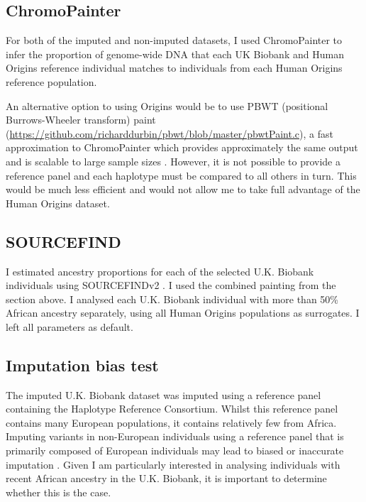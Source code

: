 \subsection{ChromoPainter}

For both of the imputed and non-imputed datasets, I used ChromoPainter to infer the proportion of genome-wide DNA that each UK Biobank and Human Origins reference individual matches to individuals from each Human Origins reference population. 

An alternative option to using Origins would be to use PBWT (positional Burrows-Wheeler transform) paint (\url{https://github.com/richarddurbin/pbwt/blob/master/pbwtPaint.c}), a fast approximation to ChromoPainter which provides approximately the same output and is scalable to large sample sizes \cite{byrne2020dutch}. However, it is not possible to provide a reference panel and each haplotype must be compared to all others in turn. This would be much less efficient and would not allow me to take full advantage of the Human Origins dataset. 

\subsection{SOURCEFIND}

I estimated ancestry proportions for each of the selected U.K. Biobank individuals using SOURCEFINDv2 \cite{Chacon-Duque2018}. I used the combined painting from the section above. I analysed each U.K. Biobank individual with more than 50\% African ancestry separately, using all Human Origins populations as surrogates. I left all parameters as default. 

\subsection{Imputation bias test} \label{sec:ImputationBiasTest}

The imputed U.K. Biobank dataset was imputed using a reference panel containing the Haplotype Reference Consortium. Whilst this reference panel contains many European populations, it contains relatively few from Africa. Imputing variants in non-European individuals using a reference panel that is primarily composed of European individuals may lead to biased or inaccurate imputation \cite{huang2011haplotype}. Given I am particularly interested in analysing individuals with recent African ancestry in the U.K. Biobank, it is important to determine whether this is the case.  

